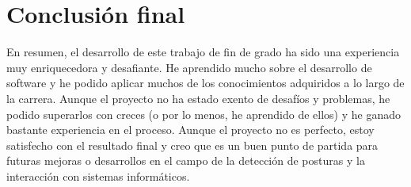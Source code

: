 \section{Conclusión final}
En resumen, el desarrollo de este trabajo de fin de grado ha sido una experiencia muy enriquecedora
y desafiante. He aprendido mucho sobre el desarrollo de software y he podido aplicar muchos de los
conocimientos adquiridos a lo largo de la carrera. Aunque el proyecto no ha estado exento de
desafíos y problemas, he podido superarlos con creces (o por lo menos, he aprendido de ellos) y he
ganado bastante experiencia en el proceso. Aunque el proyecto no es perfecto, estoy satisfecho con el
resultado final y creo que es un buen punto de partida para futuras mejoras o desarrollos en el campo
de la detección de posturas y la interacción con sistemas informáticos.
